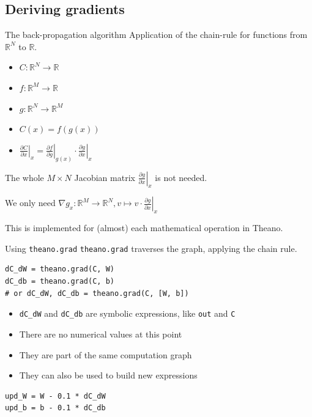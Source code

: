 \documentclass[a4paper,9pt]{beamer}
\begin{document}
\subsection{Deriving gradients}
\begin{frame}{The back-propagation algorithm}
  Application of the chain-rule for functions from ${\mathbb R}^N$ to ${\mathbb R}$.
  \begin{itemize}
    \item $C: {\mathbb R}^N \rightarrow {\mathbb R}$
    \item $f: {\mathbb R}^M \rightarrow {\mathbb R}$
    \item $g: {\mathbb R}^N \rightarrow {\mathbb R}^M$
    \item $C(x) = f(g(x))$
    \item $\left.\frac{\partial C}{\partial x}\right|_x =
              \left.\frac{\partial f}{\partial g}\right|_{g(x)}
              \cdot \left.\frac{\partial g}{\partial x}\right|_x$
  \end{itemize}
  The whole $M \times N$ Jacobian matrix $\left.\frac{\partial g}{\partial x}\right|_x$
  is not needed.

  We only need $\nabla g_x: {\mathbb R}^M \rightarrow {\mathbb R}^N, v \mapsto v \cdot \left.\frac{\partial g}{\partial x}\right|_x$

  This is implemented for (almost) each mathematical operation in Theano.
\end{frame}

\begin{frame}[fragile]{Using \texttt{theano.grad}}
\verb|theano.grad| traverses the graph, applying the chain rule.
  \begin{verbatim}
dC_dW = theano.grad(C, W)
dC_db = theano.grad(C, b)
# or dC_dW, dC_db = theano.grad(C, [W, b])
  \end{verbatim}
  \begin{itemize}
    \item \verb|dC_dW| and \verb|dC_db| are symbolic expressions, like \verb|out| and \verb|C|
    \item There are no numerical values at this point
    \item They are part of the same computation graph
    \item They can also be used to build new expressions
  \end{itemize}
  \begin{verbatim}
upd_W = W - 0.1 * dC_dW
upd_b = b - 0.1 * dC_db
  \end{verbatim}
\end{frame}
\end{document}
